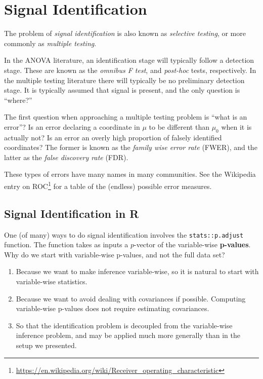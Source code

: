 \documentclass[]{book}
\providecommand{\tightlist}{%
  \setlength{\itemsep}{0pt}\setlength{\parskip}{0pt}}
\renewcommand{\href}[2]{#2\footnote{\url{#1}}}
\theoremstyle{definition}
\theoremstyle{definition}
\theoremstyle{definition}
\theoremstyle{remark}
\let\BeginKnitrBlock\begin \let\EndKnitrBlock\end
\begin{document}
\hypertarget{identification}{%
\section{Signal Identification}\label{identification}}

The problem of \emph{signal identification} is also known as \emph{selective testing}, or more commonly as \emph{multiple testing}.

In the ANOVA literature, an identification stage will typically follow a detection stage.
These are known as the \emph{omnibus F test}, and \emph{post-hoc} tests, respectively.
In the multiple testing literature there will typically be no preliminary detection stage. It is typically assumed that signal is present, and the only question is ``where?''

The first question when approaching a multiple testing problem is ``what is an error''?
Is an error declaring a coordinate in \(\mu\) to be different than \(\mu_0\) when it is actually not?
Is an error an overly high proportion of falsely identified coordinates?
The former is known as the \emph{family wise error rate} (FWER), and the latter as the \emph{false discovery rate} (FDR).

\BeginKnitrBlock{remark}
{}These types of errors have many names in many communities.
See the Wikipedia entry on \href{https://en.wikipedia.org/wiki/Receiver_operating_characteristic}{ROC} for a table of the (endless) possible error measures.
\EndKnitrBlock{remark}

\hypertarget{signal-identification-in-r}{%
\subsection{Signal Identification in R}\label{signal-identification-in-r}}

One (of many) ways to do signal identification involves the \texttt{stats::p.adjust} function.
The function takes as inputs a \(p\)-vector of the variable-wise \textbf{p-values}.
Why do we start with variable-wise p-values, and not the full data set?

\begin{enumerate}
\def\labelenumi{\alph{enumi}.}
\tightlist
\item
  Because we want to make inference variable-wise, so it is natural to start with variable-wise statistics.
\item
  Because we want to avoid dealing with covariances if possible. Computing variable-wise p-values does not require estimating covariances.
\item
  So that the identification problem is decoupled from the variable-wise inference problem, and may be applied much more generally than in the setup we presented.
\end{enumerate}
\end{document}
